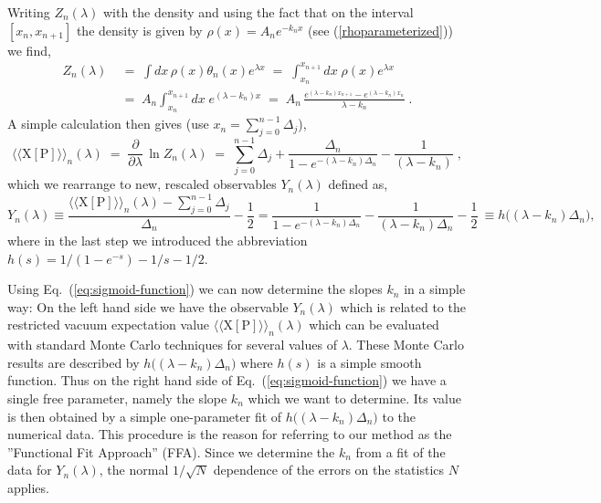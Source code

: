 \documentclass[a4paper,11pt]{article}
\begin{document}
Writing $Z_{n}(\lambda)$ with the density and using the fact that on the interval $[x_n,x_{n+1}]$ the density is given by
$\rho(x) = A_n e^{-k_n x}$ (see (\ref{rhoparameterized})) we find,
%
\begin{equation}
\begin{split}
Z_{n}(\lambda) & \; =  \; \int \!\! dx \, \rho(x) \theta_n(x) e^{\lambda x} \; = \; 
\int_{x_n}^{x_{n+1}} \!\!\!\!  dx \; \rho(x) e^{\lambda x} \\
& \; = \; A_n \int_{x_n}^{x_{n+1}} \!\!\!\! dx \; e^{(\lambda - k_n) x} \; = \;   
A_n \, \frac{ e^{(\lambda - k_n) x_{n+1}} - e^{(\lambda - k_n) x_{n} } }{\lambda - k_n} \; .
\end{split}
\end{equation}
%
A simple calculation then gives (use $x_n = \sum_{j=0}^{n-1} \Delta_j$),
%
\begin{equation}
\langle \langle \mathrm{X[P]} \rangle \rangle_{n}(\lambda) \; = \;  
\frac{\partial}{\partial {\lambda} } \, \ln  Z_{n}(\lambda)  \; = \;  
\sum\limits^{n-1}_{j=0} \Delta_j + \frac{\Delta_n}{1-e^{-(\lambda-k_n)\Delta_n}} - \frac{1}{(\lambda-k_n)} \; ,
\end{equation}
%
which we rearrange to new, rescaled observables $Y_n(\lambda)$ defined as,
\begin{equation}
Y_n(\lambda) \equiv 
\frac{\langle \langle \mathrm{X[P]} 
\rangle \rangle_{n}(\lambda) - \!\!\sum^{n-1}_{j=0} \!\! \Delta_j }{\Delta_n} - \frac{1}{2} =   
\frac{1}{1\!-\!e^{-(\lambda-k_n)\Delta_n}} - \frac{1}{(\lambda\!-\!k_n)\Delta_n} -\frac{1}{2}  \
\equiv  h\Big(\!(\lambda-k_n)\Delta_n \!\Big)  , 
\label{eq:sigmoid-function}
\end{equation}
where in the last step we introduced the abbreviation $h(s) = 1/(1-e^{-s}) - 1/s - 1/2$.

Using Eq.~(\ref{eq:sigmoid-function}) we can now determine the slopes $k_n$ 
in a simple way: On the left hand side we have the observable $Y_n(\lambda)$ which is related 
to the restricted vacuum expectation value $\langle \langle \mathrm{X[P]} \rangle \rangle_{n}(\lambda)$ 
which can be evaluated with standard Monte Carlo techniques for several values of $\lambda$. 
These Monte Carlo results are described by $h \Big(\!(\lambda-k_n)\Delta_n \!\Big)$ where $h(s)$ is a simple
smooth function. Thus on the right hand side of Eq.~(\ref{eq:sigmoid-function}) we have a single free parameter,
namely the slope $k_n$ which we want to determine. Its value is then obtained by a simple one-parameter fit of 
$h \Big(\!(\lambda-k_n)\Delta_n \!\Big)$ to the numerical data. This procedure is the reason for referring to our
method as the ''Functional Fit Approach'' (FFA). Since we determine the $k_n$ from a fit of the data for $Y_n(\lambda)$, 
the normal $1/\sqrt{N}$ dependence of the errors on the statistics $N$ applies.
\end{document}
